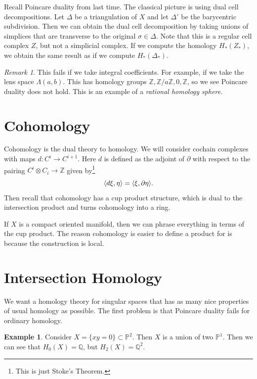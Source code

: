 \documentclass[leqno, openany]{memoir}
\DeclarePairedDelimiter{\gen}{\langle}{\rangle}
\theoremstyle{definition}
\newtheorem{exm}[thm]{Example}
\theoremstyle{remark}
\newtheorem{rmk}[thm]{Remark}
\theoremstyle{plain}
\theoremstyle{definition}
\theoremstyle{remark}
\newcommand{\Z}{\mathbb{Z}}
\newcommand{\Q}{\mathbb{Q}}
\renewcommand{\P}{\mathbb{P}}
\begin{document}
Recall Poincare duality from last time. The classical picture is using dual cell decompositions. Let $\Delta$ be a triangulation of $X$ and let $\Delta'$ be the barycentric subdivision. Then we can obtain the dual cell decomposition by taking unions of simplices that are transverse to the original $\sigma \in \Delta$. Note that this is a regular cell complex $Z$, but not a simplicial complex. If we compute the homology $H_*(Z_*)$, we obtain the same result as if we compute $H_*(\Delta_*)$.

\begin{rmk}
    This fails if we take integral coefficients. For example, if we take the lens space $\Lambda(a,b)$. This has homology groups $\Z, \Z/a\Z, 0, \Z$, so we see Poincare duality does not hold. This is an example of a \textit{rational homology sphere}.
\end{rmk}

\section{Cohomology}%
\label{sec:cohomology}

Cohomology is the dual theory to homology. We will consider cochain complexes with maps $d: C^i \to C^{i+1}$. Here $d$ is defined as the adjoint of $\partial$ with respect to the pairing $C^i \otimes C_i \to \Z$ given by\footnote{This is just Stoke's Theorem.}
\[ \gen{ d \xi, \eta } = \gen{\xi, \partial \eta}. \]
Then recall that cohomology has a cup product structure, which is dual to the intersection product and turns cohomology into a ring.

If $X$ is a compact oriented manifold, then we can phrase everything in terms of the cup product. The reason cohomology is easier to define a product for is because the construction is local.

\section{Intersection Homology}%
\label{sec:intersection_homology-2}

We want a homology theory for singular spaces that has as many nice properties of usual homology as possible. The first problem is that Poincare duality fails for ordinary homology.

\begin{exm}
    Consider $X = \{ xy = 0 \} \subset \P^2$. Then $X$ is a union of two $\P^1$. Then we can see that $H_0(X) = \Q$, but $H_2(X) = \Q^2$.
\end{exm}
\end{document}
